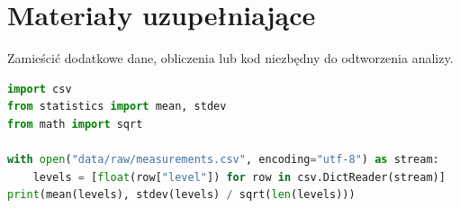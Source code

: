 \section{Materiały uzupełniające}
\label{sec:zalacznik}
Zamieścić dodatkowe dane, obliczenia lub kod niezbędny do odtworzenia analizy.
\begin{lstlisting}[language=Python,caption={Przykład obliczenia średniej i niepewności typu A.},label={lst:analiza}]
import csv
from statistics import mean, stdev
from math import sqrt

with open("data/raw/measurements.csv", encoding="utf-8") as stream:
    levels = [float(row["level"]) for row in csv.DictReader(stream)]
print(mean(levels), stdev(levels) / sqrt(len(levels)))
\end{lstlisting}
